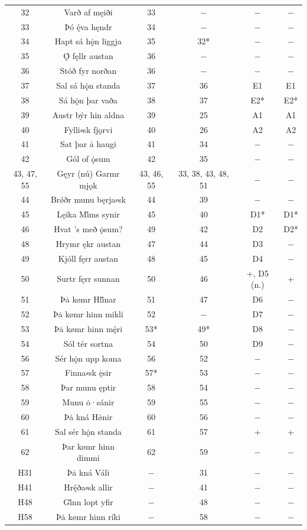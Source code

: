 {\begin{longtable}{|c c c c c c|}
	32 & Varð af męiði & 33 & − & − & − \\
	33 & Þó ę́va hęndr & 34 & − & − & − \\
	34 & Hapt sá hǫ̇n liggja & 35 & 32* & − & − \\
	35 & Ǫ́ fęllr austan & 36 & − & − & − \\
	36 & Stóð fyr norðan & 36 & − & − & − \\
	37 & Sal sá hǫ̇n standa & 37 & 36 & E1 & E1 \\
	38 & Sá hǫ̇n þar vaða & 38 & 37 & E2* & E2* \\
	39 & Austr býr hin aldna & 39 & 25 & A1 & A1 \\
	40 & Fylli⸗sk fjǫrvi & 40 & 26 & A2 & A2 \\
	41 & Sat þar ȧ haugi & 41 & 34 & − & − \\
	42 & Gól of ǫ̇sum & 42 & 35 & − & − \\
	43, 47, 55 & Gęyr (nú) Garmr mjǫk & 43, 46, 55 & 33, 38, 43, 48, 51 & − & − \\
	44 & Brǿðr munu bęrja⸗sk & 44 & 39 & − & − \\
	45 & Lęika Mi̇́ms synir & 45 & 40 & D1* & D1* \\
	46 & Hvat ’s með ǫ̇sum? & 49 & 42 & D2 & D2* \\
	48 & Hrymr ękr austan & 47 & 44 & D3 & − \\
	49 & Kjóll fęrr austan & 48 & 45 & D4 & − \\
	50 & Surtr fęrr sunnan & 50 & 46 & +, D5 (n.) & + \\
	51 & Þȧ kømr Hli̇́nar & 51 & 47 & D6 & − \\
	52 & Þȧ kømr hinn mikli & 52 & − & D7 & − \\
	53 & Þȧ kømr hinn mę́ri & 53* & 49* & D8 & − \\
	54 & Sól tér sortna & 54 & 50 & D9 & − \\
	56 & Sér hǫ̇n upp koma & 56 & 52 & − & − \\
	57 & Finna⸗sk ę̇sir & 57* & 53 & − & − \\
	58 & Þar munu ęptir & 58 & 54 & − & − \\
	59 & Munu ȯ·sánir & 59 & 55 & − & − \\
	60 & Þȧ kná Hø̇nir & 60 & 56 & − & − \\
	61 & Sal sér hǫ̇n standa & 61 & 57 & + & + \\
	62 & Þar kømr hinn dimmi & 62 & 59 & − & − \\
	H31 & Þȧ kná Váli & − & 31 & − & − \\
	H41 & Hrę́ða⸗sk allir & − & 41 & − & − \\
	H48 & Gi̇́nn lopt yfir & − & 48 & − & − \\
	H58 & Þȧ kømr hinn ríki & − & 58 & − & − \\ [1ex]

	\hline
\end{longtable}}

